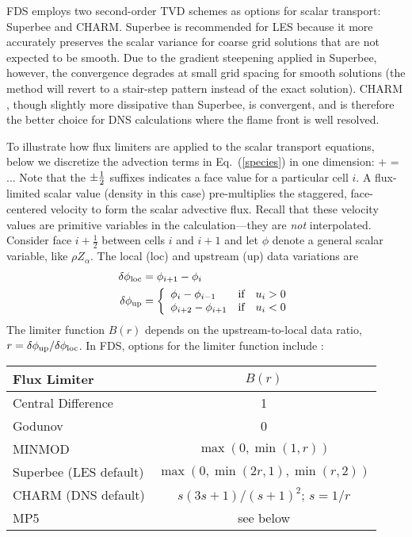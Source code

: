 FDS employs two second-order TVD schemes as options for scalar transport: Superbee and CHARM.  Superbee \cite{Roe:1986} is recommended for LES because it more accurately preserves the scalar variance for coarse grid solutions that are not expected to be smooth.  Due to the gradient steepening applied in Superbee, however, the convergence degrades at small grid spacing for smooth solutions (the method will revert to a stair-step pattern instead of the exact solution).  CHARM \cite{Zhou:1995}, though slightly more dissipative than Superbee, is convergent, and is therefore the better choice for DNS calculations where the flame front is well resolved.

To illustrate how flux limiters are applied to the scalar transport equations, below we discretize the advection terms in Eq.~(\ref{species}) in one dimension:
\be  {}
    +  = ...
\ee
Note that the $\pm\frac{1}{2}$ suffixes indicates a face value for a particular cell $i$. A flux-limited scalar value (density in this case) pre-multiplies the staggered, face-centered velocity to form the scalar advective flux.  Recall that these velocity values are primitive variables in the calculation---they are \emph{not} interpolated.
Consider face $i+\frac{1}{2}$ between cells $i$ and $i+1$ and let $\phi$ denote a general scalar variable, like $\rho Z_\alpha$.  The local (loc) and upstream (up) data variations are
\begin{align}
\delta \phi_{\rm loc} &= \phi_{i+1}-\phi_i \\
\delta \phi_{\rm up}  &= \left\{ \begin{array}{ll} \phi_i-\phi_{i-1} & \mbox{if} \quad u_i>0 \\ \phi_{i+2}-\phi_{i+1} & \mbox{if} \quad u_i<0 \end{array} \right.
\end{align}
The limiter function $B(r)$ depends on the upstream-to-local data ratio, $r=\delta \phi_{\rm up}/\delta \phi_{\rm loc}$. In FDS, options for the limiter function include \cite{Toro}:
\begin{table}[H]
\begin{center}
\begin{tabular}{lc}
Flux Limiter                           & $B(r)$                         \\
\hline
Central Difference                     & 1                              \\
Godunov                                & 0                              \\
MINMOD                                 & $\max(0,\min(1,r))$            \\
Superbee \cite{Roe:1986} (LES default) & $\max(0,\min(2r,1),\min(r,2))$ \\
CHARM \cite{Zhou:1995} (DNS default)   & $s(3s+1)/(s+1)^2$; $s=1/r$     \\
MP5 \cite{Suresh:1997}                 & see below
\end{tabular}
\end{center}
\end{table}

